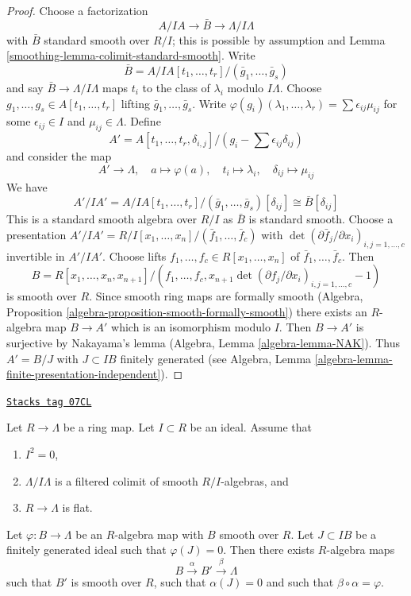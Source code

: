 \begin{proof}

Choose a factorization
$$
A/IA \to \bar B \to \Lambda/I\Lambda
$$
with $\bar B$ standard smooth over $R/I$; this is possible by
assumption and Lemma \ref{smoothing-lemma-colimit-standard-smooth}. Write
$$
\bar B = A/IA[t_1, \ldots, t_r]/(\bar g_1, \ldots, \bar g_s)
$$
and say $\bar B \to \Lambda/I\Lambda$ maps $t_i$ to the class
of $\lambda_i$ modulo $I\Lambda$. Choose
$g_1, \ldots, g_s \in A[t_1, \ldots, t_r]$ lifting
$\bar g_1, \ldots, \bar g_s$. Write
$\varphi(g_i)(\lambda_1, \ldots, \lambda_r) =
\sum \epsilon_{ij} \mu_{ij}$
for some $\epsilon_{ij} \in I$ and $\mu_{ij} \in \Lambda$. Define
$$
A' = A[t_1, \ldots, t_r, \delta_{i, j}]/
(g_i - \sum \epsilon_{ij} \delta_{ij})
$$
and consider the map
$$
A' \longrightarrow \Lambda,\quad
a \longmapsto \varphi(a),\quad
t_i \longmapsto \lambda_i,\quad
\delta_{ij} \longmapsto \mu_{ij}
$$
We have
$$
A'/IA' = A/IA[t_1, \ldots, t_r]/(\bar g_1, \ldots, \bar g_s)[\delta_{ij}]
\cong \bar B[\delta_{ij}]
$$
This is a standard smooth algebra over $R/I$ as $\bar B$ is standard
smooth. Choose a presentation
$A'/IA' = R/I[x_1, \ldots, x_n]/(\bar f_1, \ldots, \bar f_c)$ with
$\det(\partial \bar f_j/\partial x_i)_{i, j = 1, \ldots, c}$ invertible in
$A'/IA'$. Choose lifts $f_1, \ldots, f_c \in R[x_1, \ldots, x_n]$ of
$\bar f_1, \ldots, \bar f_c$. Then
$$
B = R[x_1, \ldots, x_n, x_{n + 1}]/
(f_1, \ldots, f_c,
x_{n + 1}\det(\partial f_j/\partial x_i)_{i, j = 1, \ldots, c} - 1)
$$
is smooth over $R$. Since smooth ring maps are formally smooth
(Algebra, Proposition \ref{algebra-proposition-smooth-formally-smooth})
there exists an $R$-algebra map $B \to A'$ which is an isomorphism
modulo $I$. Then $B \to A'$ is surjective by Nakayama's lemma
(Algebra, Lemma \ref{algebra-lemma-NAK}).
Thus $A' = B/J$ with $J \subset IB$ finitely generated (see
Algebra, Lemma \ref{algebra-lemma-finite-presentation-independent}).
\end{proof}

\begin{lemma}
\label{smoothing-lemma-lift-twice}
\href{https://stacks.math.columbia.edu/tag/07CL}{\texttt{Stacks tag 07CL}}

Let $R \to \Lambda$ be a ring map. Let $I \subset R$ be an ideal.
Assume that
\begin{enumerate}
\item $I^2 = 0$,
\item $\Lambda/I\Lambda$ is a filtered colimit of smooth $R/I$-algebras, and
\item $R \to \Lambda$ is flat.
\end{enumerate}
Let $\varphi : B \to \Lambda$ be an $R$-algebra map with $B$
smooth over $R$. Let $J \subset IB$ be a finitely generated ideal
such that $\varphi(J) = 0$.
Then there exists $R$-algebra maps
$$
B \xrightarrow{\alpha} B' \xrightarrow{\beta} \Lambda
$$
such that $B'$ is smooth over $R$, such that $\alpha(J) = 0$ and
such that $\beta \circ \alpha = \varphi$.
\end{lemma}

